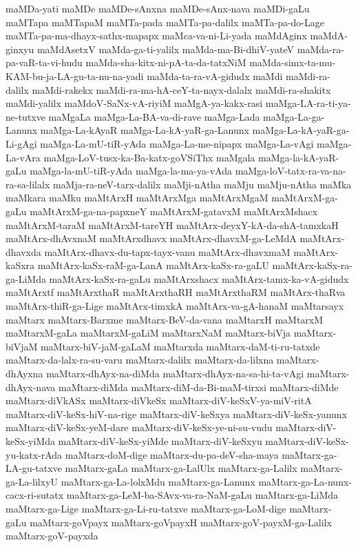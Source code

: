 {maMDa-yati
maMDe
maMDe-sAnxna
maMDe-sAnx-nava
maMDi-gaLu
maMTapa
maMTapaM
maMTa-pada
maMTa-pa-dalilx
maMTa-pa-do-Lage
maMTa-pa-ma-dhayx-sathx-mapapx
maMca-va-ni-Li-yada
maMdAginx
maMdA-ginxyu
maMdAsetxV
maMda-ga-ti-yalilx
maMda-ma-Bi-dhiV-yateV
maMda-ra-pa-vaR-ta-vi-hudu
maMda-sha-kitx-ni-pA-ta-da-tatxNiM
maMda-simx-ta-mu-KAM-bu-ja-LA-gu-ta-nu-na-yadi
maMda-ta-ra-vA-gidudx
maMdi
maMdi-ra-dalilx
maMdi-rakekx
maMdi-ra-ma-hA-ceY-ta-nayx-dalalx
maMdi-ra-shakitx
maMdi-yalilx
maMdoV-SaNx-vA-riyiM
maMgA-ya-kakx-rasi
maMga-LA-ra-ti-ya-ne-tutxve
maMgaLa
maMga-La-BA-va-di-rave
maMga-Lada
maMga-La-ga-Lanunx
maMga-La-kAyaR
maMga-La-kA-yaR-ga-Lanunx
maMga-La-kA-yaR-ga-Li-gAgi
maMga-La-mU-tiR-yAda
maMga-La-me-nipapx
maMga-La-vAgi
maMga-La-vAra
maMga-LoV-tusx-ka-Ba-katx-goVSiThx
maMgala
maMga-la-kA-yaR-gaLu
maMga-la-mU-tiR-yAda
maMga-la-ma-ya-vAda
maMga-loV-tatx-ra-va-na-ra-sa-lilalx
maMja-ra-neV-tarx-dalilx
maMji-nAtha
maMju
maMju-nAtha
maMka
maMkara
maMku
maMtArxH
maMtArxMga
maMtArxMgaM
maMtArxM-ga-gaLu
maMtArxM-ga-na-papxneY
maMtArxM-gatavxM
maMtArxMshacx
maMtArxM-taraM
maMtArxM-tareYH
maMtArx-deyxY-kA-da-shA-tamxkaH
maMtArx-dhAvxnaM
maMtArxdhavx
maMtArx-dhavxM-ga-LeMdA
maMtArx-dhavxda
maMtArx-dhavx-du-tapx-tayx-vanu
maMtArx-dhavxmaM
maMtArx-kaSxra
maMtArx-kaSx-raM-ga-LanA
maMtArx-kaSx-ra-gaLU
maMtArx-kaSx-ra-ga-LiMda
maMtArx-kaSx-ra-gaLu
maMtArxshacx
maMtArx-tamx-ka-vA-gidudx
maMtArxtf
maMtArxthaR
maMtArxthaRH
maMtArxthaRM
maMtArx-thaRva
maMtArx-thiR-ga-Lige
maMtArx-timxkA
maMtArx-va-gA-hanaM
maMtarsayx
maMtarx
maMtarx-Barxme
maMtarx-BeV-da-vana
maMtarxH
maMtarxM
maMtarxM-gaLa
maMtarxM-gaLiM
maMtarxNaM
maMtarx-biVja
maMtarx-biVjaM
maMtarx-biV-jaM-gaLaM
maMtarxda
maMtarx-daM-ti-ru-tatxde
maMtarx-da-lalx-ra-su-varu
maMtarx-dalilx
maMtarx-da-lilxna
maMtarx-dhAyxna
maMtarx-dhAyx-na-diMda
maMtarx-dhAyx-na-sa-hi-ta-vAgi
maMtarx-dhAyx-nava
maMtarx-diMda
maMtarx-diM-da-Bi-maM-tirxsi
maMtarx-diMde
maMtarx-diVkASx
maMtarx-diVkeSx
maMtarx-diV-keSxV-ya-miV-ritA
maMtarx-diV-keSx-hiV-na-rige
maMtarx-diV-keSxya
maMtarx-diV-keSx-yanunx
maMtarx-diV-keSx-yeM-dare
maMtarx-diV-keSx-ye-ni-su-vudu
maMtarx-diV-keSx-yiMda
maMtarx-diV-keSx-yiMde
maMtarx-diV-keSxyu
maMtarx-diV-keSx-yu-katx-rAda
maMtarx-doM-dige
maMtarx-du-pa-deV-sha-maya
maMtarx-ga-LA-gu-tatxve
maMtarx-gaLa
maMtarx-ga-LalUlx
maMtarx-ga-Lalilx
maMtarx-ga-La-lilxyU
maMtarx-ga-La-lolxMdu
maMtarx-ga-Lanunx
maMtarx-ga-La-nunx-cacx-ri-sutatx
maMtarx-ga-LeM-ba-SAvx-va-ra-NaM-gaLu
maMtarx-ga-LiMda
maMtarx-ga-Lige
maMtarx-ga-Li-ru-tatxve
maMtarx-ga-LoM-dige
maMtarx-gaLu
maMtarx-goVpayx
maMtarx-goVpayxH
maMtarx-goV-payxM-ga-Lalilx
maMtarx-goV-payxda
}
